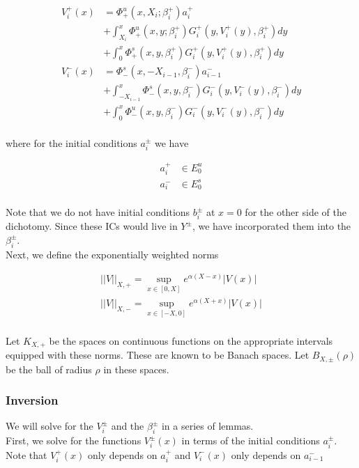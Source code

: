 \documentclass[12pt]{article}
\begin{document}
\begin{align*}
V_i^+(x) &= \Phi^u_+(x, X_i; \beta_i^+) a_i^+  \\
&+ \int_{X_i}^x \Phi_+^u(x, y; \beta_i^+) G_i^+(y, V_i^+(y),\beta_i^+)dy \\
&+ \int_0^x \Phi_+^s(x, y, \beta_i^+) G_i^+(y, V_i^+(y),\beta_i^+)dy \\ 
V_i^-(x) &= \Phi^s_-(x, -X_{i-1}, \beta_i^-) a_{i-1}^-  \\
&+ \int_{-X_{i-1}}^x \Phi_-^s(x, y, \beta_i^-) G_i^-(y, V_i^-(y),\beta_i^-)dy \\
&+ \int_0^x \Phi_-^u(x, y, \beta_i^-) G_i^-(y, V_i^-(y),\beta_i^-)dy \\
\end{align*}

where for the initial conditions $a_i^\pm$ we have

\begin{align*}
a_i^+ &\in E_0^u \\
a_i^- &\in E_0^s \\
\end{align*}

Note that we do not have initial conditions $b_i^\pm$ at $x = 0$ for the other side of the dichotomy. Since these ICs would live in $Y^\pm$, we have incorporated them into the $\beta_i^\pm$.\\

Next, we define the exponentially weighted norms

\begin{align*}
||V||_{X, +} = \sup_{x \in [0, X]} e^{\alpha(X - x)}|V(x)| \\
||V||_{X, -} = \sup_{x \in [-X, 0]} e^{\alpha(X + x)}|V(x)| \\
\end{align*}

Let $K_{X, +}$ be the spaces on continuous functions on the appropriate intervals equipped with these norms. These are known to be Banach spaces. Let $B_{X, \pm}(\rho)$ be the ball of radius $\rho$ in these spaces.\\

\subsubsection{Inversion}

We will solve for the $V_i^\pm$ and the $\beta_i^\pm$ in a series of lemmas.\\

First, we solve for the functions $V_i^\pm(x)$ in terms of the initial conditions $a_i^\pm$. Note that $V_i^+(x)$ only depends on $a_i^+$ and $V_i^-(x)$ only depends on $a_{i-1}^-$
\end{document}
